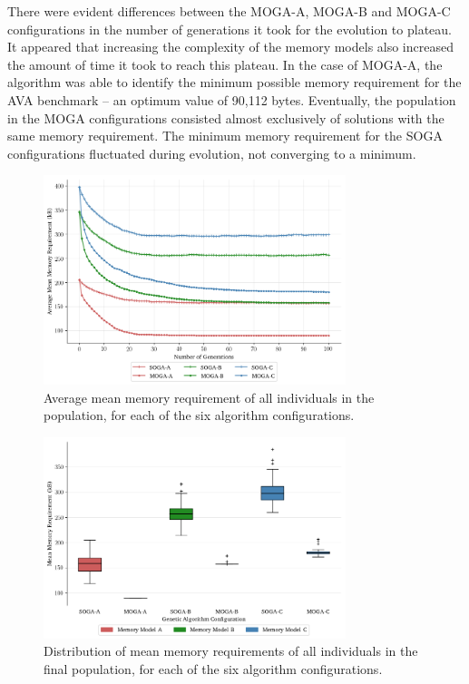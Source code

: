 \documentclass[10pt,conference]{IEEEtran}
\begin{document}
There were evident differences between the MOGA-A, MOGA-B and MOGA-C configurations in the number of generations it took for the evolution to plateau. It appeared that increasing the complexity of the memory models also increased the amount of time it took to reach this plateau. In the case of MOGA-A, the algorithm was able to identify the minimum possible memory requirement for the AVA benchmark -- an optimum value of 90,112 bytes. Eventually, the population in the MOGA configurations consisted almost exclusively of solutions with the same memory requirement. The minimum memory requirement for the SOGA configurations fluctuated during evolution, not converging to a minimum.

\begin{figure}[!ht]
  \centering
  \includegraphics*[width=8.8cm,keepaspectratio]{fig/results-avg-memory-requirement-generations}
\vspace{-5ex}
  \caption{Average mean memory requirement of all individuals in the population, for each of the six algorithm configurations.}
  \label{fig:results-avg-memory-requirement-generations}
\vspace{-2.5ex}
\end{figure}

\begin{figure}[!ht]
  \centering
  \includegraphics*[width=8.8cm,keepaspectratio]{fig/results-avg-memory-requirement-boxplot}
\vspace{-4ex}
  \caption{Distribution of mean memory requirements of all individuals in the final population, for each of the six algorithm configurations.}
  \label{fig:results-avg-memory-requirement-boxplot}
\vspace{-3ex}
\end{figure}
\end{document}
